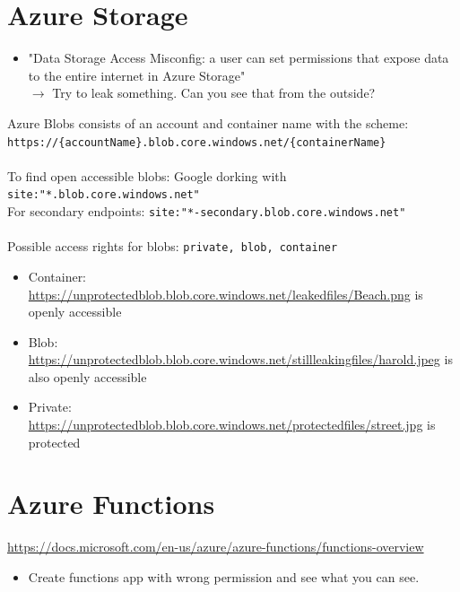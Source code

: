 \documentclass[12pt]{article}
\begin{document}
\section*{Azure Storage}
\begin{itemize}
    \item "Data Storage Access Misconfig: a user can set permissions that expose data to the entire internet in Azure Storage" \\ $\rightarrow$ Try to leak something. Can you see that from the outside?
\end{itemize}
Azure Blobs consists of an account and container name with the scheme: \\ \verb|https://{accountName}.blob.core.windows.net/{containerName}|\\ \\
To find open accessible blobs: Google dorking with \verb|site:"*.blob.core.windows.net"| \\
For secondary endpoints: \verb|site:"*-secondary.blob.core.windows.net"| \\ \\
Possible access rights for blobs: \verb|private, blob, container|
\begin{itemize}
    \item Container: \url{https://unprotectedblob.blob.core.windows.net/leakedfiles/Beach.png} is openly accessible
    \item Blob: \url{https://unprotectedblob.blob.core.windows.net/stillleakingfiles/harold.jpeg} is also openly accessible
    \item Private: \url{https://unprotectedblob.blob.core.windows.net/protectedfiles/street.jpg} is protected
\end{itemize}


\section*{Azure Functions}
\url{https://docs.microsoft.com/en-us/azure/azure-functions/functions-overview}
\begin{itemize}
    \item Create functions app with wrong permission and see what you can see.
\end{itemize}
\end{document}
